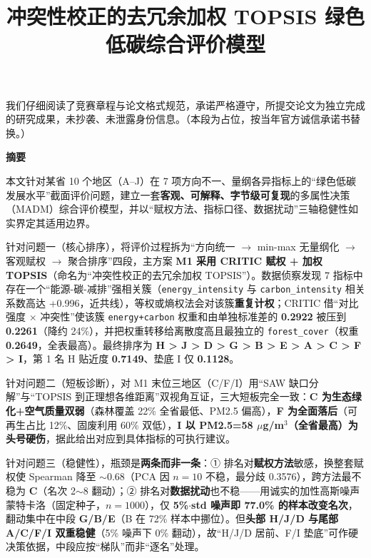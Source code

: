 \documentclass[12pt,a4paper]{ctexart}
\title{\textbf{冲突性校正的去冗余加权 TOPSIS 绿色低碳综合评价模型}}
\author{}
\date{}
\begin{document}
\thispagestyle{empty}
\noindent 我们仔细阅读了竞赛章程与论文格式规范，承诺严格遵守，所提交论文为独立完成的研究成果，未抄袭、未泄露身份信息。（本段为占位，按当年官方诚信承诺书替换。）
\newpage

\maketitle
\vspace{-2em}
\begin{center}\textbf{\large 摘\quad 要}\end{center}
\noindent
本文针对某省 10 个地区（A--J）在 7 项方向不一、量纲各异指标上的``绿色低碳发展水平''截面评价问题，建立一套\textbf{客观、可解释、字节级可复现}的多属性决策（MADM）综合评价模型，并以``赋权方法、指标口径、数据扰动''三轴稳健性如实界定其适用边界。

针对问题一（核心排序），将评价过程拆为``方向统一 $\rightarrow$ min-max 无量纲化 $\rightarrow$ 客观赋权 $\rightarrow$ 聚合排序''四段，主方案 \textbf{M1 采用 CRITIC 赋权 + 加权 TOPSIS}（命名为``冲突性校正的去冗余加权 TOPSIS''）。数据侦察发现 7 指标中存在一个``能源-碳-减排''强相关簇（\texttt{energy\_intensity} 与 \texttt{carbon\_intensity} 相关系数高达 +0.996，近共线），等权或熵权法会对该簇\textbf{重复计权}；CRITIC 借``对比强度 $\times$ 冲突性''使该簇 \texttt{energy+carbon} 权重和由单独标准差的 \textbf{0.2922} 被压到 \textbf{0.2261}（降约 24\%），并把权重转移给离散度高且最独立的 \texttt{forest\_cover}（权重 \textbf{0.2649}，全表最高）。最终排序为 \textbf{H > J > D > G > B > E > A > C > F > I}，第 1 名 H 贴近度 \textbf{0.7149}、垫底 I 仅 \textbf{0.1128}。

针对问题二（短板诊断），对 M1 末位三地区（C/F/I）用``SAW 缺口分解''与``TOPSIS 到正理想各维距离''双视角互证，三大短板完全一致：\textbf{C 为生态绿化+空气质量双弱}（森林覆盖 22\% 全省最低、PM2.5 偏高），\textbf{F 为全面落后}（可再生占比 12\%、固废利用 60\% 双低），\textbf{I 以 PM2.5=58 $\mu$g/m$^3$（全省最高）为头号硬伤}，据此给出对应到具体指标的可执行建议。

针对问题三（稳健性），瓶颈是\textbf{两条而非一条}：① 排名对\textbf{赋权方法}敏感，换整套赋权使 Spearman 降至 $\sim$0.68（PCA 因 $n=10$ 不稳，最分歧 0.3576），跨方法最不稳为 \textbf{C}（名次 2$\sim$8 翻动）；② 排名对\textbf{数据扰动}也不稳——用诚实的加性高斯噪声蒙特卡洛（固定种子，$n=1000$），仅 \textbf{5\%$\cdot$std 噪声即 77.0\% 的样本改变名次}，翻动集中在中段 \textbf{G/B/E}（B 在 72\% 样本中挪位）。但\textbf{头部 H/J/D 与尾部 A/C/F/I 双重稳健}（5\% 噪声下 0\% 翻动），故``H/J/D 居前、F/I 垫底''可作硬决策依据，中段应按``梯队''而非``逐名''处理。
\end{document}

